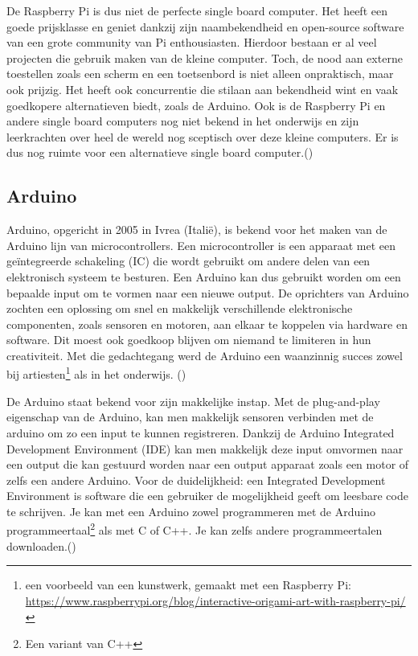 De Raspberry Pi is dus niet de perfecte single board computer. Het heeft een goede prijsklasse en geniet dankzij zijn naambekendheid en open-source software van een grote community van Pi enthousiasten. Hierdoor bestaan er al veel projecten die gebruik maken van de kleine computer. Toch, de nood aan externe toestellen zoals een scherm en een toetsenbord is niet alleen onpraktisch, maar ook prijzig. Het heeft ook concurrentie die stilaan aan bekendheid wint en vaak goedkopere alternatieven biedt, zoals de Arduino. Ook is de Raspberry Pi en andere single board computers nog niet bekend in het onderwijs en zijn leerkrachten over heel de wereld nog sceptisch over deze kleine computers. Er is dus nog ruimte voor een alternatieve single board computer.(\cite{Susan2014})

\subsection{Arduino}

Arduino, opgericht in 2005 in Ivrea (Italië), is bekend voor het maken van de Arduino lijn van microcontrollers. Een microcontroller is een apparaat met een geïntegreerde schakeling (IC) die wordt gebruikt om andere delen van een elektronisch systeem te besturen. Een Arduino kan dus gebruikt worden om een bepaalde input om te vormen naar een nieuwe output. De oprichters van Arduino zochten een oplossing om snel en makkelijk verschillende elektronische componenten, zoals sensoren en motoren, aan elkaar te koppelen via hardware en software. Dit moest ook goedkoop blijven om niemand te limiteren in hun creativiteit. Met die gedachtegang werd de Arduino een waanzinnig succes zowel bij artiesten\footnote{een voorbeeld van een kunstwerk, gemaakt met een Raspberry Pi: \url{https://www.raspberrypi.org/blog/interactive-origami-art-with-raspberry-pi/}} als in het onderwijs. (\cite{Hughes})

De Arduino staat bekend voor zijn makkelijke instap. Met de plug-and-play eigenschap van de Arduino, kan men makkelijk sensoren verbinden met de arduino om zo een input te kunnen registreren. Dankzij de Arduino Integrated Development Environment (IDE) kan men makkelijk deze input omvormen naar een output die kan gestuurd worden naar een output apparaat zoals een motor of zelfs een andere Arduino. Voor de duidelijkheid: een Integrated Development Environment is software die een gebruiker de mogelijkheid geeft om leesbare code te schrijven. Je kan met een Arduino zowel programmeren met de Arduino programmeertaal\footnote{Een variant van C++} als met C of C++. Je kan zelfs andere programmeertalen downloaden.(\cite{Teja2021})

